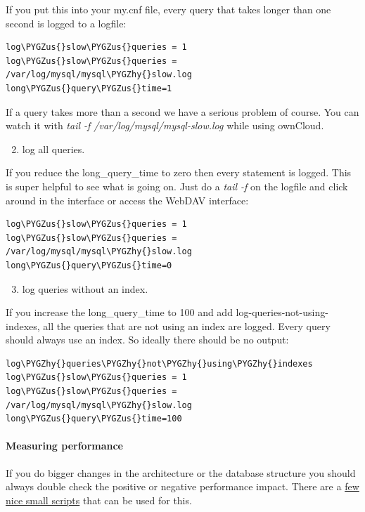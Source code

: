 \documentclass[letterpaper,10pt,english]{sphinxmanual}
\def\PYGZus{\char`\_}
\def\PYGZhy{\char`\-}
\begin{document}
If you put this into your my.cnf file, every query that takes longer than one second is logged to a logfile:

\begin{Verbatim}[commandchars=\\\{\}]
log\PYGZus{}slow\PYGZus{}queries = 1
log\PYGZus{}slow\PYGZus{}queries = /var/log/mysql/mysql\PYGZhy{}slow.log
long\PYGZus{}query\PYGZus{}time=1
\end{Verbatim}

If a query takes more than a second we have a serious problem of course. You can watch it with \emph{tail -f /var/log/mysql/mysql-slow.log} while using ownCloud.
\begin{enumerate}
\setcounter{enumi}{1}
\item {} 
log all queries.

\end{enumerate}

If you reduce the long\_query\_time to zero then every statement is logged. This is super helpful to see what is going on. Just do a \emph{tail -f} on the logfile and click around in the interface or access the WebDAV interface:

\begin{Verbatim}[commandchars=\\\{\}]
log\PYGZus{}slow\PYGZus{}queries = 1
log\PYGZus{}slow\PYGZus{}queries = /var/log/mysql/mysql\PYGZhy{}slow.log
long\PYGZus{}query\PYGZus{}time=0
\end{Verbatim}
\begin{enumerate}
\setcounter{enumi}{2}
\item {} 
log queries without an index.

\end{enumerate}

If you increase the long\_query\_time to 100 and add log-queries-not-using-indexes, all the queries that are not using an index are logged. Every query should always use an index. So ideally there should be no output:

\begin{Verbatim}[commandchars=\\\{\}]
log\PYGZhy{}queries\PYGZhy{}not\PYGZhy{}using\PYGZhy{}indexes
log\PYGZus{}slow\PYGZus{}queries = 1
log\PYGZus{}slow\PYGZus{}queries = /var/log/mysql/mysql\PYGZhy{}slow.log
long\PYGZus{}query\PYGZus{}time=100
\end{Verbatim}


\paragraph{Measuring performance}
\label{general/performance:measuring-performance}
If you do bigger changes in the architecture or the database structure you should always double check the positive or negative performance impact. There are a \href{https://github.com/owncloud/administration/tree/master/performance-tests}{few nice small scripts} that can be used for this.
\end{document}
